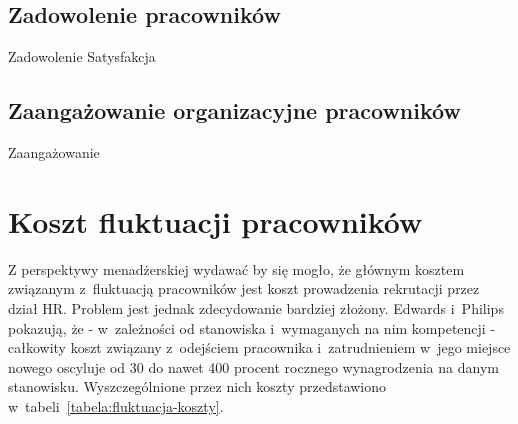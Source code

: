 
\subsection{Zadowolenie pracowników}\label{sec:czynniki-wplywajace-na-fluktuacje:zadowolenie}
Zadowolenie \cite{sowinska-2014}
Satysfakcja \cite{robak-2013}

\subsection{Zaangażowanie organizacyjne pracowników}\label{sec:czynniki-wplywajace-na-fluktuacje:zaangazowanie-organizacyjne}
Zaangażowanie \cite{jedynak-2010}

\section{Koszt fluktuacji pracowników}\label{sec:koszt-fluktuacji}

Z perspektywy menadżerskiej wydawać by się mogło, że głównym kosztem związanym z~fluktuacją pracowników jest koszt prowadzenia rekrutacji przez dział HR.
Problem jest jednak zdecydowanie bardziej złożony.
Edwards i~Philips \cite{philips-edwards-2009} pokazują, że - w~zależności od stanowiska i~wymaganych na nim kompetencji -
całkowity koszt związany z~odejściem pracownika i~zatrudnieniem w~jego miejsce nowego oscyluje od 30 do nawet 400 procent
rocznego wynagrodzenia na danym stanowisku. Wyszczególnione przez nich koszty przedstawiono w~tabeli~\ref{tabela:fluktuacja-koszty}.

